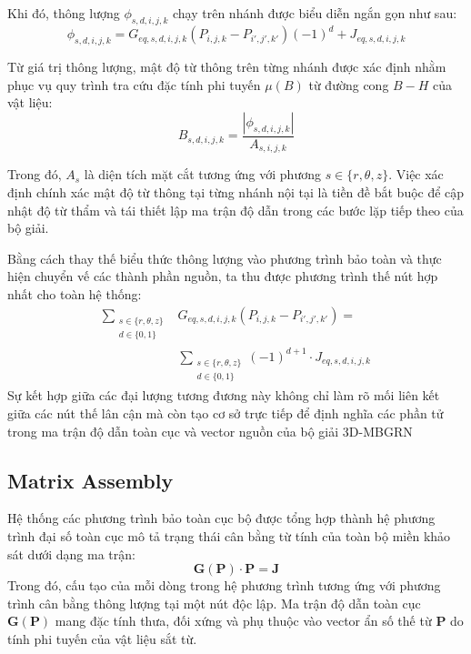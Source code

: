 Khi đó, thông lượng $\phi_{s,d,i,j,k}$ chạy trên nhánh được biểu diễn ngắn gọn như sau:
\begin{equation}
    \phi_{s,d,i,j,k} = G_{eq,s,d,i,j,k} (P_{i,j,k} - P_{i',j',k'})(-1)^d + J_{eq,s,d,i,j,k}
\end{equation}

Từ giá trị thông lượng, mật độ từ thông trên từng nhánh được xác định nhằm phục vụ quy trình tra cứu đặc tính phi tuyến $\mu(B)$ từ đường cong $B-H$ của vật liệu:
\begin{equation}
    B_{s,d,i,j,k} = \frac{|\phi_{s,d,i,j,k}|}{A_{s,i,j,k}}
\end{equation}

Trong đó, $A_{s}$ là diện tích mặt cắt tương ứng với phương $s \in \{r, \theta, z\}$. Việc xác định chính xác mật độ từ thông tại từng nhánh nội tại là tiền đề bắt buộc để cập nhật độ từ thẩm và tái thiết lập ma trận độ dẫn trong các bước lặp tiếp theo của bộ giải.

Bằng cách thay thế biểu thức thông lượng vào phương trình bảo toàn và thực hiện chuyển vế các thành phần nguồn, ta thu được phương trình thế nút hợp nhất cho toàn hệ thống:
\begin{equation}
\begin{aligned}
    \sum_{\substack{s \in \{r, \theta, z\} \\ d \in \{0, 1\}}} & G_{eq,s,d,i,j,k} (P_{i,j,k} - P_{i',j',k'}) = \\
    & \sum_{\substack{s \in \{r, \theta, z\} \\ d \in \{0, 1\}}} (-1)^{d+1} \cdot J_{eq,s,d,i,j,k}
\end{aligned}
\end{equation}
Sự kết hợp giữa các đại lượng tương đương này không chỉ làm rõ mối liên kết giữa các nút thế lân cận mà còn tạo cơ sở trực tiếp để định nghĩa các phần tử trong ma trận độ dẫn toàn cục và vector nguồn của bộ giải 3D-MBGRN  

\subsection{Matrix Assembly}

Hệ thống các phương trình bảo toàn cục bộ được tổng hợp thành hệ phương trình đại số toàn cục mô tả trạng thái cân bằng từ tính của toàn bộ miền khảo sát dưới dạng ma trận:
\begin{equation}
    \mathbf{G}(\mathbf{P}) \cdot \mathbf{P} = \mathbf{J}
\end{equation}
Trong đó, cấu tạo của mỗi dòng trong hệ phương trình tương ứng với phương trình cân bằng thông lượng tại một nút độc lập. Ma trận độ dẫn toàn cục $\mathbf{G}(\mathbf{P})$ mang đặc tính thưa, đối xứng và phụ thuộc vào vector ẩn số thế từ $\mathbf{P}$ do tính phi tuyến của vật liệu sắt từ.

